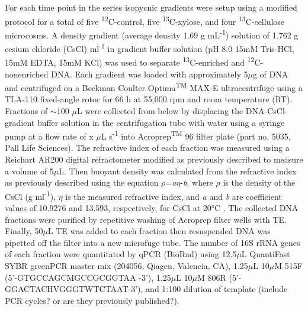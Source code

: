 For each time point in the series isopycnic gradients were setup using a modified protocol \cite{Neufeld_2007} for a total of five \textsuperscript{12}C-control, five \textsuperscript{13}C-xylose, and four \textsuperscript{13}C-cellulose microcosms. A density gradient (average density 1.69 g mL\textsuperscript{-1}) solution of 1.762 g cesium chloride (CsCl) ml\textsuperscript{-1} in gradient buffer solution (pH 8.0 15mM Tris-HCl, 15mM EDTA, 15mM KCl) was used to separate \textsuperscript{13}C-enriched and \textsuperscript{12}C-nonenriched DNA. Each gradient was loaded with approximately 5$\mu$g of DNA and centrifuged on a Beckman Coulter Optima\textsuperscript{TM} MAX-E ultracentrifuge using a TLA-110 fixed-angle rotor for 66 h at 55,000 rpm and room temperature (RT). Fractions of $\sim$100 $\mu$L were collected from below by displacing the DNA-CsCl-gradient buffer solution in the centrifugation tube with water using a syringe pump at a flow rate of x $\mu$L s\textsuperscript{-1} \cite{Manefield_2002} into Acroprep\textsuperscript{TM} 96 filter plate (part no. 5035, Pall Life Sciences). The refractive index of each fraction was measured using a Reichart AR200 digital refractometer modified as previously described \cite{Buckley_2007} to measure a volume of 5$\mu$L. Then buoyant density was calculated from the refractive index as previously described \cite{Buckley_2007} using the equation $\rho$=\textit{a}$\eta$-\textit{b}, where $\rho$ is the density of the CsCl (g ml\textsuperscript{-1}), $\eta$ is the measured refractive index, and \textit{a} and \textit{b} are coefficient values of 10.9276 and 13.593, respectively, for CsCl at 20°C \cite{9780408708036}. The collected DNA fractions were purified by repetitive washing of Acroprep filter wells with TE. Finally, 50$\mu$L TE was added to each fraction then resuspended DNA was pipetted off the filter into a new microfuge tube. The number of 16S rRNA genes of each fraction were quantitated by qPCR (BioRad) using 12.5$\mu$L QuantiFast  SYBR greenPCR  master mix (204056, Qiagen, Valencia, CA), 1.25$\mu$L 10$\mu$M 515F (5'-GTGCCAGCMGCCGCGGTAA -3'), 1.25$\mu$L 10$\mu$M 806R (5'-GGACTACHVGGGTWTCTAAT-3'), and 1:100 dilution of template (include PCR cycles? or are they previously published?). 

